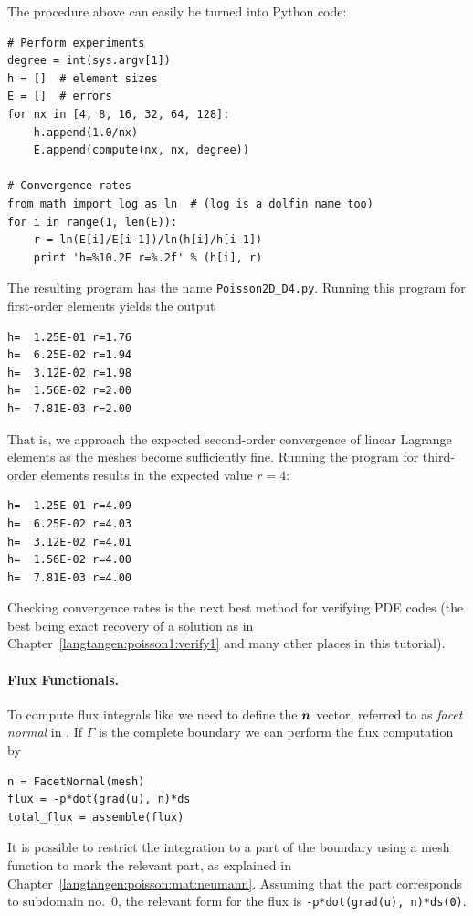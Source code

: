 The procedure above can easily be turned into Python code:
\begin{Verbatim}[fontsize=\fontsize{10pt}{10pt},tabsize=8,baselinestretch=1.05,
fontfamily=tt,xleftmargin=7mm]
# Perform experiments
degree = int(sys.argv[1])
h = []  # element sizes
E = []  # errors
for nx in [4, 8, 16, 32, 64, 128]:
    h.append(1.0/nx)
    E.append(compute(nx, nx, degree))

# Convergence rates
from math import log as ln  # (log is a dolfin name too)
for i in range(1, len(E)):
    r = ln(E[i]/E[i-1])/ln(h[i]/h[i-1])
    print 'h=%10.2E r=%.2f' % (h[i], r)
\end{Verbatim}
\noindent
The resulting program has the name {\fontsize{12pt}{12pt}\verb!Poisson2D_D4.py!}. Running this
program for first-order elements yields the output
\begin{Verbatim}[fontsize=\fontsize{10pt}{10pt},tabsize=8,baselinestretch=1.05,
fontfamily=tt,xleftmargin=7mm]
h=  1.25E-01 r=1.76
h=  6.25E-02 r=1.94
h=  3.12E-02 r=1.98
h=  1.56E-02 r=2.00
h=  7.81E-03 r=2.00
\end{Verbatim}
\noindent
That is, we approach the expected second-order convergence of linear
Lagrange elements as the meshes become sufficiently fine.
Running the program for third-order elements results in the
expected value $r=4$:
\begin{Verbatim}[fontsize=\fontsize{10pt}{10pt},tabsize=8,baselinestretch=1.05,
fontfamily=tt,xleftmargin=7mm]
h=  1.25E-01 r=4.09
h=  6.25E-02 r=4.03
h=  3.12E-02 r=4.01
h=  1.56E-02 r=4.00
h=  7.81E-03 r=4.00
\end{Verbatim}
\noindent
Checking convergence rates is the next best method for verifying PDE codes
(the best being exact recovery of a solution as in Chapter~\ref{langtangen:poisson1:verify1} and many other places in this tutorial).

\paragraph{Flux Functionals.}
To compute flux integrals like 
we need to define the ${\mbox{\boldmath $n$}}$ vector, referred to as \emph{facet normal}
in \fenics. If $\Gamma$ is the complete boundary we can perform
the flux computation by
\begin{Verbatim}[fontsize=\fontsize{10pt}{10pt},tabsize=8,baselinestretch=1.05,
fontfamily=tt,xleftmargin=7mm]
n = FacetNormal(mesh)
flux = -p*dot(grad(u), n)*ds
total_flux = assemble(flux)
\end{Verbatim}
\noindent
It is possible to restrict the integration to a part of the boundary
using a mesh function to mark the relevant part, as
explained in Chapter~\ref{langtangen:poisson:mat:neumann}. Assuming that the
part corresponds to subdomain no.~0, the relevant form for the
flux is {\fontsize{12pt}{12pt}\texttt{-p*dot(grad(u), n)*ds(0)}}.


